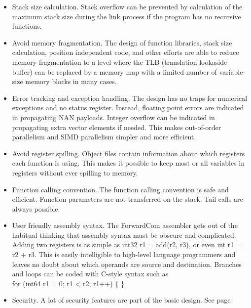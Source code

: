 \documentclass[forwardcom.tex]{subfiles}
\begin{document}
\begin{itemize}
\item Stack size calculation. Stack overflow can be prevented by calculation of the maximum stack size during the link process if the program has no recursive functions.

\item Avoid memory fragmentation. The design of function libraries, stack size calculation, position independent code, and other efforts are able to reduce memory fragmentation to a level where the TLB (translation lookaside buffer) can be replaced by a memory map with a limited number of variable-size memory blocks in many cases.

\item Error tracking and exception handling. The design has no traps for numerical exceptions and no status register. Instead, floating point errors are indicated in propagating NAN payloads. Integer overflow can be indicated in propagating extra vector elements if needed. This makes out-of-order parallelism and SIMD parallelism simpler and more efficient.

\item Avoid register spilling. Object files contain information about which registers each function is using. This makes it possible to keep most or all variables in registers without ever spilling to memory.

\item Function calling convention. The function calling convention is safe and efficient. Function parameters are not transferred on the stack. Tail calls are always possible.

\item User friendly assembly syntax. The ForwardCom assembler gets out of the habitual thinking that assembly syntax must be obscure and complicated. Adding two registers is as simple as {\ttfamily int32 r1 = add(r2, r3)}, or even {\ttfamily int r1 = r2 + r3}. This is easily intelligible to high-level language programmers and leaves no doubt about which operands are source and destination. 
Branches and loops can be coded with C-style syntax such as \\
{\ttfamily for (int64 r1 = 0; r1 < r2; r1++) \{  \} }

\item Security. A lot of security features are part of the basic design. 
See page \pageref{securityFeatures}

\end{itemize}
\vspace{2mm}
\end{document}
